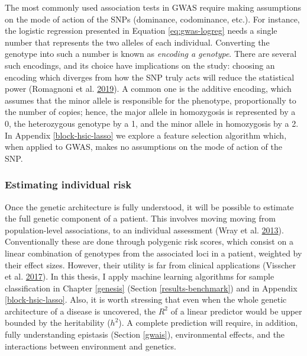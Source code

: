 \documentclass[
  11pt,
]{env/yjiao}
\begin{document}
The most commonly used association tests in GWAS require making assumptions on the mode of action of the SNPs (dominance, codominance, etc.). For instance, the logistic regression presented in Equation \eqref{eq:gwas-logreg} needs a single number that represents the two alleles of each individual. Converting the genotype into such a number is known as \emph{encoding a genotype}. There are several such encodings, and its choice have implications on the study: choosing an encoding which diverges from how the SNP truly acts will reduce the statistical power (Romagnoni et al. \protect\hyperlink{ref-romagnoni_comparative_2019}{2019}). A common one is the additive encoding, which assumes that the minor allele is responsible for the phenotype, proportionally to the number of copies; hence, the major allele in homozygosis is represented by a 0, the heterozygous genotype by a 1, and the minor allele in homozygosis by a 2. In Appendix \ref{block-hsic-lasso} we explore a feature selection algorithm which, when applied to GWAS, makes no assumptions on the mode of action of the SNP.

\hypertarget{estimating-individual-risk}{%
\subsubsection{Estimating individual risk}\label{estimating-individual-risk}}

Once the genetic architecture is fully understood, it will be possible to estimate the full genetic component of a patient. This involves moving moving from population-level associations, to an individual assessment (Wray et al. \protect\hyperlink{ref-wray_pitfalls_2013}{2013}). Conventionally these are done through polygenic risk scores, which consist on a linear combination of genotypes from the associated loci in a patient, weighted by their effect sizes. However, their utility is far from clinical applications (Visscher et al. \protect\hyperlink{ref-visscher_10_2017}{2017}). In this thesis, I apply machine learning algorithms for sample classification in Chapter \ref{genesis} (Section \ref{results-benchmark}) and in Appendix \ref{block-hsic-lasso}. Also, it is worth stressing that even when the whole genetic architecture of a disease is uncovered, the \(R^2\) of a linear predictor would be upper bounded by the heritability (\(h^2\)). A complete prediction will require, in addition, fully understanding epistasis (Section \ref{gwais}), environmental effects, and the interactions between environment and genetics.
\end{document}
